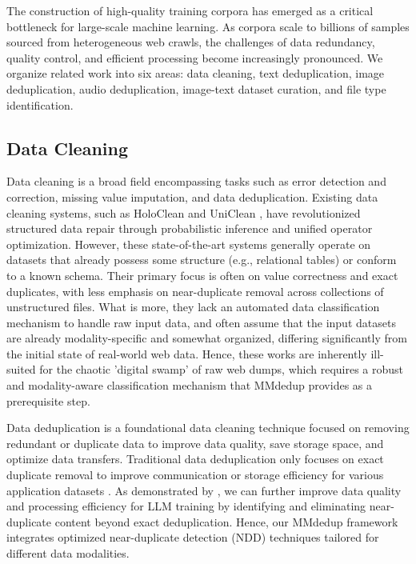 \documentclass[conference]{IEEEtran}
\begin{document}
The construction of high-quality training corpora has emerged as a critical bottleneck for large-scale machine learning. As corpora scale to billions of samples sourced from heterogeneous web crawls, the challenges of data redundancy, quality control, and efficient processing become increasingly pronounced. We organize related work into six areas: data cleaning, text deduplication, image deduplication, audio deduplication, image-text dataset curation, and file type identification.

\vspace{-1mm}
\subsection{Data Cleaning}

 Data cleaning is a broad field encompassing tasks such as error detection and correction, missing value imputation, and data deduplication. Existing data cleaning systems, such as HoloClean \cite{rekatsinas2017} and UniClean \cite{ding2025}, have revolutionized structured data repair through probabilistic inference and unified operator optimization. However, these state-of-the-art systems generally operate on datasets that already possess some structure (e.g., relational tables) or conform to a known schema. Their primary focus is often on value correctness and exact duplicates, with less emphasis on near-duplicate removal across collections of unstructured files. What is more, they lack an automated data classification mechanism to handle raw input data, and often assume that the input datasets are already modality-specific and somewhat organized, differing significantly from the initial state of real-world web data. Hence, these works are inherently ill-suited for the chaotic 'digital swamp' of raw web dumps, which requires a robust and modality-aware classification mechanism that MMdedup provides as a prerequisite step.

 Data deduplication is a foundational data cleaning technique focused on removing redundant or duplicate data to improve data quality, save storage space, and optimize data transfers. Traditional data deduplication only focuses on exact duplicate removal to improve communication or storage efficiency for various application datasets \cite{Fu2025, Xia2016}. As demonstrated by \cite{lee2022deduplicating}, we can further improve data quality and processing efficiency for LLM training by identifying and eliminating near-duplicate content beyond exact deduplication. Hence, our MMdedup framework integrates optimized near-duplicate detection (NDD) techniques tailored for different data modalities.
\end{document}
